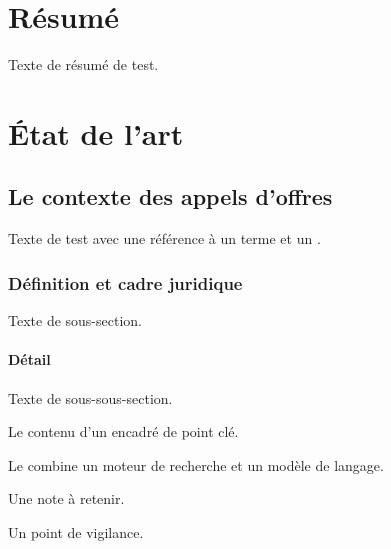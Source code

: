 \documentclass[12pt,a4paper,oneside,openany]{report}
\begin{document}
\color{btpink}
\hypersetup{pageanchor=false}
\makecovertitle
\makeinnertitle
\hypersetup{pageanchor=true}

\chapter*{Résumé}
Texte de résumé de test. 

\tableofcontents\clearpage
\listoffigures\clearpage
\listoftables

\setcounter{page}{1}
\chapter{État de l'art}

\section{Le contexte des appels d'offres}
Texte de test avec une référence à un terme  et un
.

\subsection{Définition et cadre juridique}
Texte de sous-section.

\subsubsection{Détail}
Texte de sous-sous-section.

\begin{btpbox}
Le contenu d'un encadré de point clé.
\end{btpbox}

\begin{btpdef}
Le  combine un moteur de recherche
et un modèle de langage.
\end{btpdef}

\begin{btpnote}
Une note à retenir.
\end{btpnote}

\begin{btpwarn}
Un point de vigilance.
\end{btpwarn}
\end{document}
